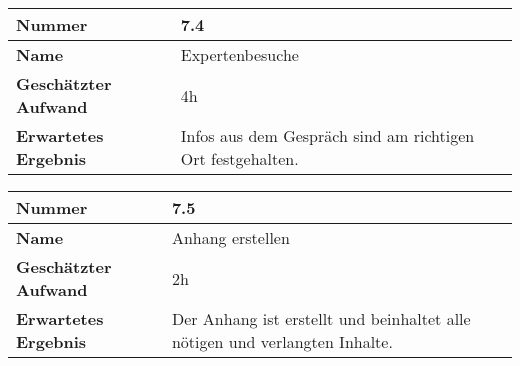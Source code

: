 \begin{longtable}{p{}|p{}}
	\hline
	\textbf{Nummer}    				& 7.4 \\
	\hline
	\textbf{Name}   				& Expertenbesuche\\
	\hline
	\textbf{Geschätzter Aufwand}	& 4h \\
	\hline
	\textbf{Erwartetes Ergebnis}	& Infos aus dem Gespräch sind am richtigen Ort festgehalten.\\
	\hline
\end{longtable}

\begin{longtable}{p{}|p{}}
	\hline
	\textbf{Nummer}    				& 7.5 \\
	\hline
	\textbf{Name}   				& Anhang erstellen\\
	\hline
	\textbf{Geschätzter Aufwand}	& 2h \\
	\hline
	\textbf{Erwartetes Ergebnis}	& Der Anhang ist erstellt und beinhaltet alle nötigen und verlangten Inhalte.\\
	\hline
\end{longtable}